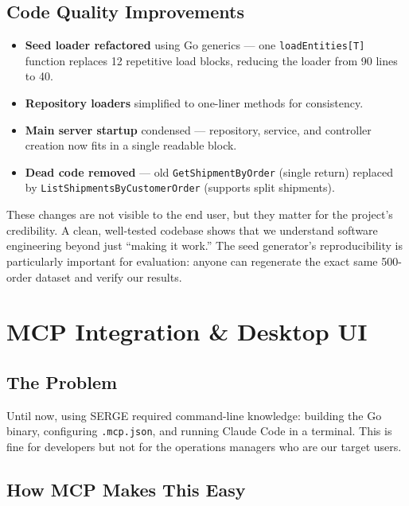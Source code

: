 \documentclass[11pt,a4paper]{article}
\begin{document}
\subsection{Code Quality Improvements}

\begin{itemize}[itemsep=0.5em]
    \item \textbf{Seed loader refactored} using Go generics --- one \texttt{loadEntities[T]} function replaces 12 repetitive load blocks, reducing the loader from 90 lines to 40.
    \item \textbf{Repository loaders} simplified to one-liner methods for consistency.
    \item \textbf{Main server startup} condensed --- repository, service, and controller creation now fits in a single readable block.
    \item \textbf{Dead code removed} --- old \texttt{GetShipmentByOrder} (single return) replaced by \texttt{ListShipmentsByCustomerOrder} (supports split shipments).
\end{itemize}

\begin{keyinsight}
These changes are not visible to the end user, but they matter for the project's credibility. A clean, well-tested codebase shows that we understand software engineering beyond just ``making it work.'' The seed generator's reproducibility is particularly important for evaluation: anyone can regenerate the exact same 500-order dataset and verify our results.
\end{keyinsight}

\section{MCP Integration \& Desktop UI}

\subsection{The Problem}

Until now, using SERGE required command-line knowledge: building the Go binary, configuring \texttt{.mcp.json}, and running Claude Code in a terminal. This is fine for developers but not for the operations managers who are our target users.

\subsection{How MCP Makes This Easy}
\end{document}
